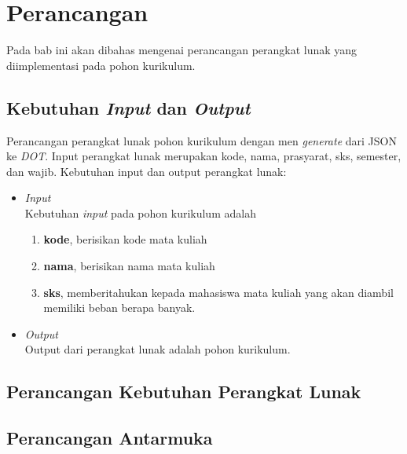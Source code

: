 \chapter{Perancangan}
\label{chap: Perancangan}

Pada bab ini akan dibahas mengenai perancangan perangkat lunak yang diimplementasi pada pohon kurikulum.

\section{Kebutuhan \textit{Input} dan \textit{Output}}
\label{sec: Kebutuhan Input dan Output}
Perancangan perangkat lunak pohon kurikulum dengan men \textit{generate} dari JSON ke \textit{DOT}. Input perangkat lunak merupakan kode, nama, prasyarat, sks, semester, dan wajib.
Kebutuhan input dan output perangkat lunak:
\begin{itemize}
\item \textit{Input} \\
Kebutuhan \textit{input} pada pohon kurikulum adalah
\begin{enumerate}
\item \textbf{kode}, berisikan kode mata kuliah
\item \textbf{nama}, berisikan nama mata kuliah
\item \textbf{sks}, memberitahukan kepada mahasiswa mata kuliah yang akan diambil memiliki beban berapa banyak.
\end{enumerate}
\item \textit{Output}\\
Output dari perangkat lunak adalah pohon kurikulum.
\end{itemize}

\section{Perancangan Kebutuhan Perangkat Lunak}
\label{sec: Perancangan Kebutuhan Perangkat Lunak}




\section{Perancangan Antarmuka}
\label{sec: Perancangan Antarmuka}